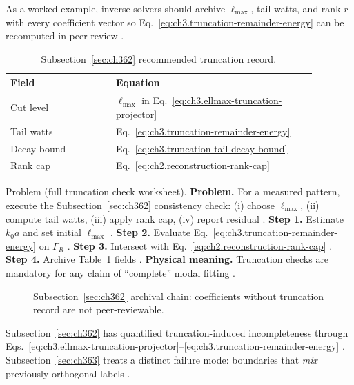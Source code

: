 As a worked example, inverse solvers should archive \(\ell_{\max}\), tail watts, and rank \(r\) with every coefficient vector so
Eq.~\eqref{eq:ch3.truncation-remainder-energy} can be recomputed in peer review \cite{devaney2004}.
\begin{table}[t]
\centering
\caption{Subsection~\ref{sec:ch362} recommended truncation record.}
\label{tab:ch3.362-truncation-metadata}
\small
\begin{tabular}{@{}p{0.30\linewidth}p{0.58\linewidth}@{}}
\toprule
Field & Equation \\
\midrule
Cut level & \(\ell_{\max}\) in Eq.~\eqref{eq:ch3.ellmax-truncation-projector} \\
Tail watts & Eq.~\eqref{eq:ch3.truncation-remainder-energy} \\
Decay bound & Eq.~\eqref{eq:ch3.truncation-tail-decay-bound} \\
Rank cap & Eq.~\eqref{eq:ch2.reconstruction-rank-cap} \\
\bottomrule
\end{tabular}
\end{table}
Problem (full truncation check worksheet). \textbf{Problem.} For a measured pattern, execute the Subsection~\ref{sec:ch362} consistency check: (i) choose \(\ell_{\max}\),
(ii) compute tail watts, (iii) apply rank cap, (iv) report residual \cite{harrington2001}.
\textbf{Step 1.} Estimate \(k_{0}a\) and set initial \(\ell_{\max}\) \cite{jackson1999}.
\textbf{Step 2.} Evaluate Eq.~\eqref{eq:ch3.truncation-remainder-energy} on \(\Gamma_R\) \cite{poynting1884}.
\textbf{Step 3.} Intersect with Eq.~\eqref{eq:ch2.reconstruction-rank-cap} \cite{harrington2001}.
\textbf{Step 4.} Archive Table~\ref{tab:ch3.362-truncation-metadata} fields \cite{devaney2004}.
\textbf{Physical meaning.} Truncation checks are mandatory for any claim of ``complete'' modal fitting \cite{harrington2001}.
\begin{figure}[t]
\centering
{}
\caption{Subsection~\ref{sec:ch362} archival chain: coefficients without truncation record are not peer-reviewable.}
\label{fig:ch3.362-archive-chain}
\end{figure}
Subsection~\ref{sec:ch362} has quantified truncation-induced incompleteness through
Eqs.~\eqref{eq:ch3.ellmax-truncation-projector}--\eqref{eq:ch3.truncation-remainder-energy}
\cite{hansen1988}. Subsection~\ref{sec:ch363} treats a distinct failure mode: boundaries
that \emph{mix} previously orthogonal labels \cite{stratton1941}.

